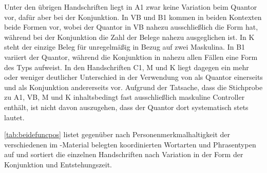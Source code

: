 Unter den übrigen Handschriften liegt in A1 zwar keine Variation
beim Quantor vor, dafür aber bei der Konjunktion. In VB und
B1 kommen in beiden Kontexten beide Formen vor, wobei der Quantor in
VB nahezu ausschließlich die Form  hat, während bei der
Konjunktion die Zahl der Belege nahezu ausgeglichen ist. In K steht
der einzige Beleg für  unregelmäßig in Bezug auf zwei Maskulina.
In B1 variiert der Quantor, während die Konjunktion in nahezu allen
Fällen eine Form des Typs  aufweist. In den Handschriften
C1, M und K liegt dagegen ein mehr oder
weniger deutlicher Unterschied in der Verwendung von  als Quantor
einerseits und  als Konjunktion andererseits vor. Aufgrund der
Tatsache, dass die Stichprobe zu A1, VB, M und
K inhaltsbedingt fast ausschließlich maskuline Controller enthält,
ist nicht davon auszugehen, dass der Quantor dort systematisch stets
 lautet.

\cref{tab:beidefuncpos} listet  gegenüber  nach
Personenmerkmalhaltigkeit der verschiedenen im \KC{}-Material belegten
koordinierten Wortarten und Phrasentypen auf und sortiert die einzelnen
Handschriften nach Variation in der Form der Konjunktion und Entstehungszeit.

